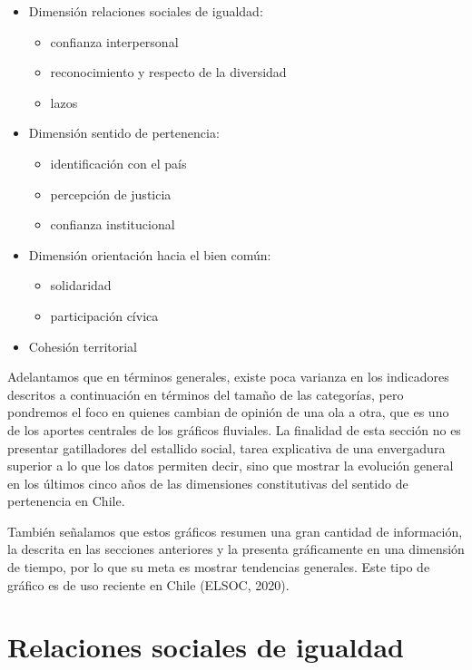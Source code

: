 \documentclass[
  12pt,
]{book}
\begin{document}
\begin{itemize}
\item
  Dimensión relaciones sociales de igualdad:

  \begin{itemize}
  \item
    confianza interpersonal
  \item
    reconocimiento y respecto de la diversidad
  \item
    lazos
  \end{itemize}
\item
  Dimensión sentido de pertenencia:

  \begin{itemize}
  \item
    identificación con el país
  \item
    percepción de justicia
  \item
    confianza institucional
  \end{itemize}
\item
  Dimensión orientación hacia el bien común:

  \begin{itemize}
  \item
    solidaridad
  \item
    participación cívica
  \end{itemize}
\item
  Cohesión territorial
\end{itemize}

Adelantamos que en términos generales, existe poca varianza en los indicadores descritos a continuación en términos del tamaño de las categorías, pero pondremos el foco en quienes cambian de opinión de una ola a otra, que es uno de los aportes centrales de los gráficos fluviales. La finalidad de esta sección no es presentar gatilladores del estallido social, tarea explicativa de una envergadura superior a lo que los datos permiten decir, sino que mostrar la evolución general en los últimos cinco años de las dimensiones constitutivas del sentido de pertenencia en Chile.

También señalamos que estos gráficos resumen una gran cantidad de información, la descrita en las secciones anteriores y la presenta gráficamente en una dimensión de tiempo, por lo que su meta es mostrar tendencias generales. Este tipo de gráfico es de uso reciente en Chile (ELSOC, 2020).

\hypertarget{relaciones-sociales-de-igualdad-1}{%
\section{Relaciones sociales de igualdad}\label{relaciones-sociales-de-igualdad-1}}
\end{document}
